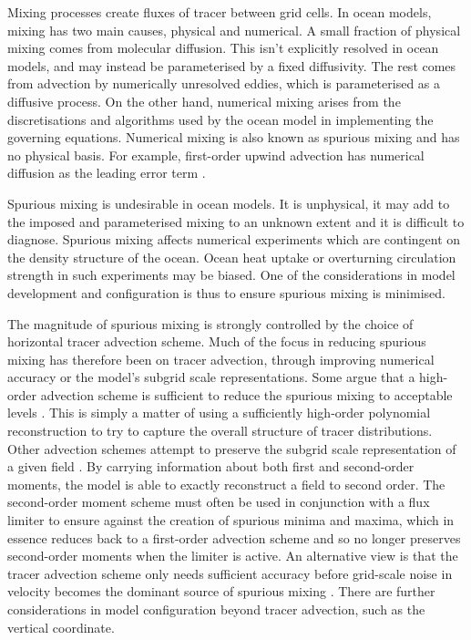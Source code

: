 Mixing processes create fluxes of tracer between grid cells. In ocean models, mixing has two main causes, physical and numerical. A small fraction of physical mixing comes from molecular diffusion. This isn't explicitly resolved in ocean models, and may instead be parameterised by a fixed diffusivity. The rest comes from advection by numerically unresolved eddies, which is parameterised as a diffusive process. On the other hand, numerical mixing arises from the discretisations and algorithms used by the ocean model in implementing the governing equations. Numerical mixing is also known as spurious mixing and has no physical basis. For example, first-order upwind advection has numerical diffusion as the leading error term \citep{gentry66}.

Spurious mixing is undesirable in ocean models. It is unphysical, it may add to the imposed and parameterised mixing to an unknown extent and it is difficult to diagnose. Spurious mixing affects numerical experiments which are contingent on the density structure of the ocean. Ocean heat uptake or overturning circulation strength in such experiments may be biased. One of the considerations in model development and configuration is thus to ensure spurious mixing is minimised.

The magnitude of spurious mixing is strongly controlled by the choice of horizontal tracer advection scheme. Much of the focus in reducing spurious mixing has therefore been on tracer advection, through improving numerical accuracy or the model's subgrid scale representations. Some argue that a high-order advection scheme is sufficient to reduce the spurious mixing to acceptable levels \citep{daru04}. This is simply a matter of using a sufficiently high-order polynomial reconstruction to try to capture the overall structure of tracer distributions. Other advection schemes attempt to preserve the subgrid scale representation of a given field \citep{prather86}. By carrying information about both first and second-order moments, the model is able to exactly reconstruct a field to second order. The second-order moment scheme must often be used in conjunction with a flux limiter to ensure against the creation of spurious minima and maxima, which in essence reduces back to a first-order advection scheme and so no longer preserves second-order moments when the limiter is active. An alternative view is that the tracer advection scheme only needs sufficient accuracy before grid-scale noise in velocity becomes the dominant source of spurious mixing \citep{ilicak12}. There are further considerations in model configuration beyond tracer advection, such as the vertical coordinate.


